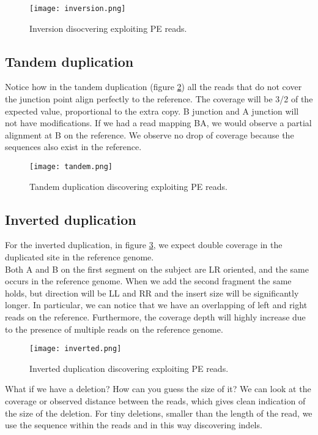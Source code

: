 \begin{figure}[H]
    \centering
    \texttt{[image: inversion.png]}
    \caption{Inversion disocvering exploiting PE reads.}
    \label{fig:inversion}
\end{figure}


\subsection{Tandem duplication}
Notice how in the tandem duplication (figure \ref{fig:tandem}) all the reads that do not cover the junction point align perfectly to the reference.
The coverage will be 3/2 of the expected value, proportional to the extra copy. B junction and A junction will not have modifications. If we had a read mapping BA, we would observe a partial alignment at B on the reference.
We observe no drop of coverage because the sequences also exist in the reference. \\

\begin{figure}[H]
    \centering
    \texttt{[image: tandem.png]}
    \caption{Tandem duplication discovering exploiting PE reads.}
    \label{fig:tandem}
\end{figure}

\subsection{Inverted duplication}
For the inverted duplication, in figure \ref{fig:inverted}, we expect double coverage in the duplicated site in the reference genome. \\
Both A and B on the first segment on the subject are LR oriented, and the same occurs in the reference genome.
When we add the second fragment the same holds, but direction will be LL and RR and the insert size will be significantly longer. In particular, we can notice that we have an overlapping of left and right reads on the reference. Furthermore, the coverage depth will highly increase due to the presence of multiple reads on the reference genome.

\begin{figure}[H]
    \centering
    \texttt{[image: inverted.png]}
    \caption{Inverted duplication discovering exploiting PE reads.}
    \label{fig:inverted}
\end{figure}

What if we have a deletion? How can you guess the size of it? We can look at the coverage or observed distance between the reads, which gives clean indication of the size of the deletion. For tiny deletions, smaller than the length of the read, we use the sequence within the reads and in this way discovering indels.

